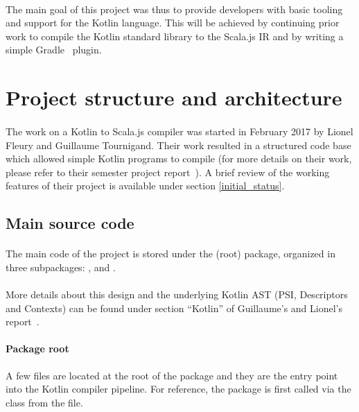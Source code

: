 \paragraph{} The main goal of this project was thus to provide developers with basic 
tooling and support for the Kotlin language. This will be achieved by continuing prior work to 
compile the Kotlin standard library to the Scala.js IR and by writing a simple Gradle~\cite{gradle} 
plugin.

\section{Project structure and architecture}

\paragraph{} The work on a Kotlin to Scala.js compiler was started in February 2017 by Lionel 
Fleury and Guillaume Tournigand. Their work resulted in a structured code base which allowed simple 
Kotlin programs to compile (for more details on their work, please refer to their semester project 
report~\cite{kotlin_scalajs_report}). A brief review of the working features of their project is 
available under section \ref{initial_status}.

\subsection*{Main source code}

\paragraph{} The main code of the project is stored under the  
(root) package, organized in three subpackages: ,  and 
.

\paragraph{} More details about this design and the underlying Kotlin AST (PSI, Descriptors and 
Contexts) can be found under section \enquote{Kotlin} of Guillaume's and Lionel's 
report~\cite{kotlin_scalajs_report}.

\paragraph{Package root} A few files are located at the root of the  
package and they are the entry point into the Kotlin compiler pipeline. For reference, the 
 package is first called via the  class from the 
 file.
      
